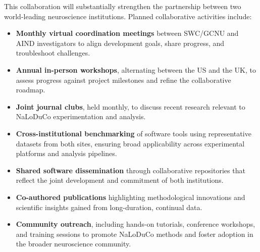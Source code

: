This collaboration will substantially strengthen the partnership between two world-leading neuroscience institutions. Planned collaborative activities include:

\begin{itemize}
  \item \textbf{Monthly virtual coordination meetings} between SWC/GCNU and AIND investigators to align development goals, share progress, and troubleshoot challenges.
  
  \item \textbf{Annual in-person workshops}, alternating between the US and the UK, to assess progress against project milestones and refine the collaborative roadmap.
  
  \item \textbf{Joint journal clubs}, held monthly, to discuss recent research relevant to NaLoDuCo experimentation and analysis.
  
  \item \textbf{Cross-institutional benchmarking} of software tools using representative datasets from both sites, ensuring broad applicability across experimental platforms and analysis pipelines.
  
  \item \textbf{Shared software dissemination} through collaborative repositories that reflect the joint development and commitment of both institutions.
  
  \item \textbf{Co-authored publications} highlighting methodological innovations and scientific insights gained from long-duration, continual data.
  
  \item \textbf{Community outreach}, including hands-on tutorials, conference workshops, and training sessions to promote NaLoDuCo methods and foster adoption in the broader neuroscience community.
\end{itemize}

